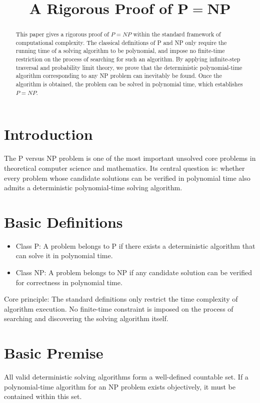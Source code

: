 \documentclass[10pt,a4paper]{article}
\begin{document}
\title{A Rigorous Proof of $\boldsymbol{P=NP}$}
\author{}
\date{}
\maketitle
\begin{abstract}
This paper gives a rigorous proof of $P=NP$ within the standard framework of computational complexity. The classical definitions of P and NP only require the running time of a solving algorithm to be polynomial, and impose no finite-time restriction on the process of searching for such an algorithm. By applying infinite-step traversal and probability limit theory, we prove that the deterministic polynomial-time algorithm corresponding to any NP problem can inevitably be found. Once the algorithm is obtained, the problem can be solved in polynomial time, which establishes $P=NP$.
\end{abstract}
\section{Introduction}
The P versus NP problem is one of the most important unsolved core problems in theoretical computer science and mathematics. Its central question is: whether every problem whose candidate solutions can be verified in polynomial time also admits a deterministic polynomial-time solving algorithm.
\section{Basic Definitions}
\begin{itemize}[leftmargin=*]
    \item Class P: A problem belongs to P if there exists a deterministic algorithm that can solve it in polynomial time.
    \item Class NP: A problem belongs to NP if any candidate solution can be verified for correctness in polynomial time.
\end{itemize}
Core principle: The standard definitions only restrict the time complexity of algorithm execution. No finite-time constraint is imposed on the process of searching and discovering the solving algorithm itself.
\section{Basic Premise}
All valid deterministic solving algorithms form a well-defined countable set. If a polynomial-time algorithm for an NP problem exists objectively, it must be contained within this set.
\end{document}
